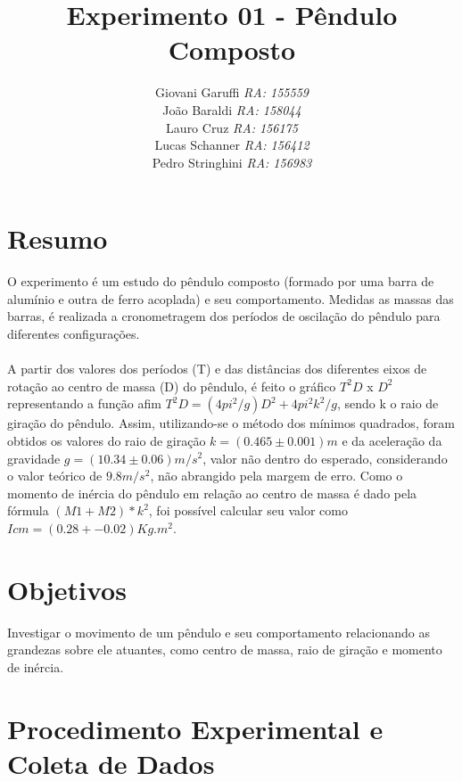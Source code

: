 \documentclass[12pt,a4paper]{article}
\begin{document}
\title{\vspace{70mm}\Huge Experimento 01 - Pêndulo Composto}
\author{ Giovani Garuffi\qquad\hfill
		\textit {RA: 155559}\protect\\
		João Baraldi\hfill
		\textit{RA: 158044}\protect\\
		Lauro Cruz\hfill
		\textit{RA: 156175}\protect\\
		Lucas Schanner\hfill
		\textit{RA: 156412}\protect\\
		Pedro Stringhini\hfill
		\textit {RA: 156983}								
		}
\maketitle
\newpage
\section{Resumo}

O experimento é um estudo do pêndulo composto (formado por uma barra de alumínio e outra de ferro acoplada) e seu comportamento. Medidas as massas das barras, é realizada a cronometragem dos períodos de oscilação do pêndulo para diferentes configurações.\\\\
A partir dos valores dos períodos (T) e das distâncias dos diferentes eixos de rotação ao centro de massa (D) do pêndulo, é feito o gráfico $T^2D$ x $D^2$ representando a função afim $T^2D = (4pi^2/g)D^2 + 4pi^2k^2/g$, sendo k o raio de giração do pêndulo. Assim, utilizando-se o método dos mínimos quadrados, foram obtidos os valores do raio de giração $k = (0.465 \pm 0.001)m$ e da aceleração da gravidade $g = (10.34 \pm 0.06) m/s^2$, valor não dentro do esperado, considerando o valor teórico de $9.8 m/s^2$, não abrangido pela margem de erro. Como o momento de inércia do pêndulo em relação ao centro de massa é dado pela fórmula $(M1 + M2)*k^2$, foi possível calcular seu valor como $Icm = (0.28 +- 0.02)Kg.m^2$.
\section{Objetivos}
Investigar o movimento de um pêndulo e seu comportamento relacionando as grandezas sobre ele atuantes, como centro de massa, raio de giração e momento de inércia.

\section{Procedimento Experimental e Coleta de Dados}
\end{document}

